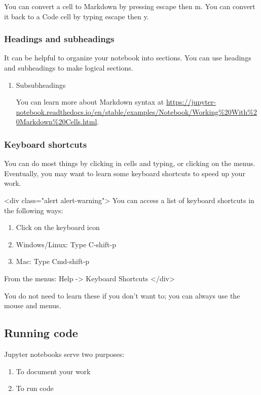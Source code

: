 \documentclass[11pt]{article}
\begin{document}
You can convert a cell to Markdown by pressing escape then m. You can convert it back to a Code cell by typing escape then y.

\subsubsection{Headings and subheadings}
\label{sec:org5225518}

It can be helpful to organize your notebook into sections. You can use headings and subheadings to make logical sections.

\begin{enumerate}
\item Subsubheadings
\label{sec:orgfd0c640}

You can learn more about Markdown syntax at \url{https://jupyter-notebook.readthedocs.io/en/stable/examples/Notebook/Working\%20With\%20Markdown\%20Cells.html}.
\end{enumerate}

\subsubsection{Keyboard shortcuts}
\label{sec:org01e4427}

You can do most things by clicking in cells and typing, or clicking on the menus. Eventually, you may want to learn some keyboard shortcuts to speed up your work.

<div class="alert alert-warning">
You can access a list of keyboard shortcuts in the following ways:

\begin{enumerate}
\item Click on the keyboard icon
\item Windows/Linux: Type C-shift-p
\item Mac: Type Cmd-shift-p
\end{enumerate}

From the menus:
Help -> Keyboard Shortcuts
</div>

You do not need to learn these if you don't want to; you can always use the mouse and menus.

\subsection{Running code}
\label{sec:orge552e31}

Jupyter notebooks serve two purposes:

\begin{enumerate}
\item To document your work
\item To run code
\end{enumerate}
\end{document}
